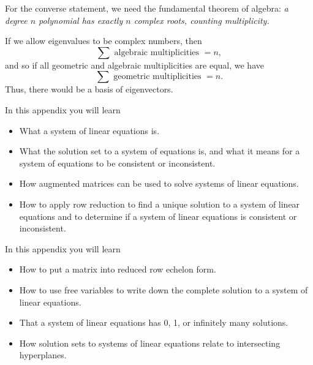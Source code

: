 \begin{parts}
\begin{solution}
				For the converse statement, we need the fundamental theorem of algebra:\emph{
					a degree $n$ polynomial has exactly $n$ complex roots, counting multiplicity.}

				If we allow eigenvalues to be complex numbers, then
				\[
					\sum \text{ algebraic multiplicities }= n,
				\]
				and so if all geometric and algebraic multiplicities are equal, we have
				\[
					\sum \text{ geometric multiplicities } = n.
				\]
				Thus, there would be a basis of eigenvectors.
			\end{solution}
	\end{parts}

\begin{appendix}\label{moduleSLEI}

	In this appendix you will learn
	\begin{itemize}
		\item What a system of linear equations is.
		\item What the solution set to a system of equations is, and what it means for a system of equations
			to be consistent or inconsistent.
		\item How augmented matrices can be used to solve systems of linear equations.
		\item How to apply row reduction to find a unique solution to a system of linear
			equations and to determine if a system of linear equations is consistent or inconsistent.
	\end{itemize}

	
	
\end{appendix}

\begin{appendix}

	In this appendix you will learn
	\begin{itemize}
		\item How to put a matrix into reduced row echelon form.
		\item How to use free variables to write down the complete solution to a system of linear equations.
		\item That a system of linear equations has 0, 1, or infinitely many solutions.
		\item How solution sets to systems of linear equations relate to intersecting hyperplanes.
	\end{itemize}

	
	
\end{appendix}

